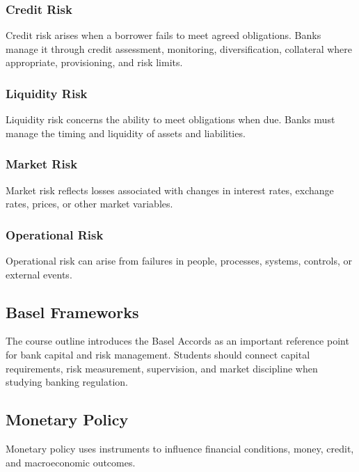 \documentclass[
]{article}
\begin{document}
\subsubsection{Credit Risk}\label{credit-risk}

Credit risk arises when a borrower fails to meet agreed obligations. Banks manage it through credit assessment, monitoring, diversification, collateral where appropriate, provisioning, and risk limits.

\subsubsection{Liquidity Risk}\label{liquidity-risk}

Liquidity risk concerns the ability to meet obligations when due. Banks must manage the timing and liquidity of assets and liabilities.

\subsubsection{Market Risk}\label{market-risk}

Market risk reflects losses associated with changes in interest rates, exchange rates, prices, or other market variables.

\subsubsection{Operational Risk}\label{operational-risk}

Operational risk can arise from failures in people, processes, systems, controls, or external events.

\subsection{Basel Frameworks}\label{basel-frameworks}

The course outline introduces the Basel Accords as an important reference point for bank capital and risk management. Students should connect capital requirements, risk measurement, supervision, and market discipline when studying banking regulation.

\subsection{Monetary Policy}\label{monetary-policy}

Monetary policy uses instruments to influence financial conditions, money, credit, and macroeconomic outcomes.
\end{document}
